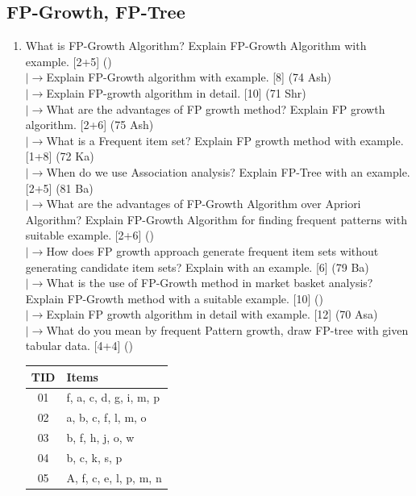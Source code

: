 \documentclass[12pt]{article}
\newcommand{\lb}{\\$\left|\rightarrow\right.$}
\begin{document}
  \subsection{FP-Growth, FP-Tree}
    \begin{enumerate}[topsep=0pt, noitemsep]
      \item What is FP-Growth Algorithm? Explain FP-Growth Algorithm with example. \hfill [2+5] ()
        \lb Explain FP-Growth algorithm with example. \hfill [8] (74 Ash)
        \lb Explain FP-growth algorithm in detail. \hfill [10] (71 Shr)
        \lb What are the advantages of FP growth method? Explain FP growth algorithm. \hfill [2+6] (75 Ash)
        \lb What is a Frequent item set? Explain FP growth method with example. \hfill [1+8] (72 Ka)
        \lb When do we use Association analysis? Explain FP-Tree with an example. \hfill [2+5] (81 Ba)
        \lb What are the advantages of FP-Growth Algorithm over Apriori Algorithm? Explain FP-Growth Algorithm for finding frequent patterns with suitable example. \hfill [2+6] ()
        \lb How does FP growth approach generate frequent item sets without generating candidate item sets? Explain with an example. \hfill [6] (79 Ba)
        \lb What is the use of FP-Growth method in market basket analysis? Explain FP-Growth method with a suitable example. \hfill [10] ()
        \lb Explain FP growth algorithm in detail with example. \hfill [12] (70 Asa)
        \lb What do you mean by frequent Pattern growth, draw FP-tree with given tabular data. \hfill [4+4] ()\\
        \small
        \begin{tabular}{|c|l|}
          \hline
          TID & Items \\ \hline
          01 & f, a, c, d, g, i, m, p \\ \hline
          02 & a, b, c, f, l, m, o \\ \hline
          03 & b, f, h, j, o, w \\ \hline
          04 & b, c, k, s, p \\ \hline
          05 & A, f, c, e, l, p, m, n \\ \hline
        \end{tabular}
        \normalsize


\end{enumerate}
\end{document}
